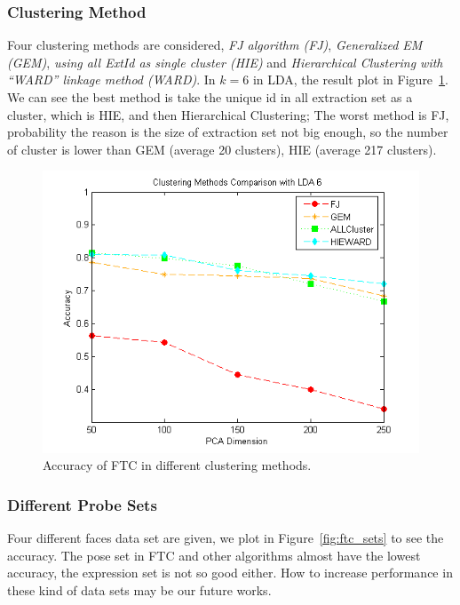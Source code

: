 \documentclass[10pt,twocolumn,letterpaper]{article}
\begin{document}
\subsubsection{Clustering Method}
Four clustering methods are considered, {\it FJ algorithm (FJ)}, 
{\it Generalized EM (GEM)}, {\it using all ExtId as single cluster (HIE)} and
{\it Hierarchical Clustering with ``WARD'' linkage method (WARD)}.
In $k=6$ in LDA, the result plot in Figure~\ref{fig:ftc_clustering}.
We can see the best method is take the unique id in all extraction set as a
cluster, which is HIE, and then Hierarchical Clustering; The worst method is
FJ, probability the reason is the size of extraction set not big enough, so
the number of cluster is lower than GEM (average 20 clusters), HIE
(average 217 clusters).

\begin{figure}[t]
    \begin{center}
        \includegraphics[width=0.8\linewidth]{fig/ftc/ftc_clustering.png}
    \end{center}
    \caption{Accuracy of FTC in different clustering methods.}
    \label{fig:ftc_clustering}
\end{figure}


\subsubsection{Different Probe Sets}
Four different faces data set are given, we plot in 
Figure~\ref{fig:ftc_sets} to see the accuracy. The pose set
in FTC and other algorithms almost have the lowest accuracy,
the expression set is not so good either. How to increase
performance in these kind of data sets may be our future works.
\end{document}
